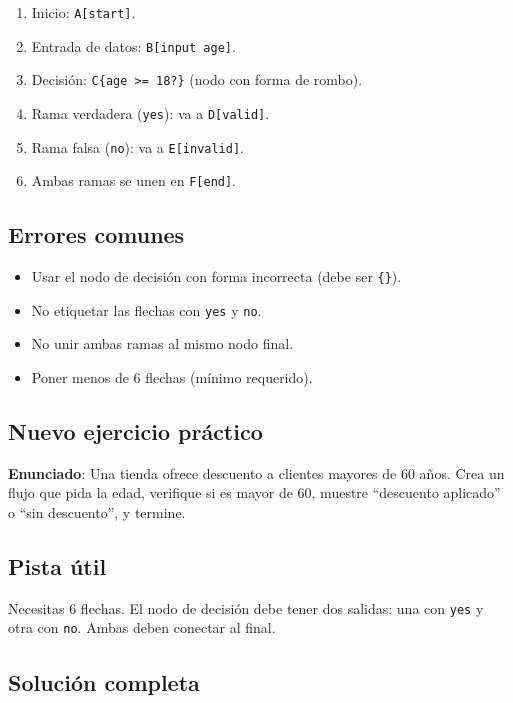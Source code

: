 \documentclass[12pt]{article}
\begin{document}
\begin{enumerate}
    \item Inicio: \texttt{A[start]}.
    \item Entrada de datos: \texttt{B[input age]}.
    \item Decisión: \texttt{C\{age >= 18?\}} (nodo con forma de rombo).
    \item Rama verdadera (\texttt{yes}): va a \texttt{D[valid]}.
    \item Rama falsa (\texttt{no}): va a \texttt{E[invalid]}.
    \item Ambas ramas se unen en \texttt{F[end]}.
\end{enumerate}

\subsection{Errores comunes}

\begin{itemize}
    \item Usar el nodo de decisión con forma incorrecta (debe ser \texttt{\{\}}).
    \item No etiquetar las flechas con \texttt{yes} y \texttt{no}.
    \item No unir ambas ramas al mismo nodo final.
    \item Poner menos de 6 flechas (mínimo requerido).
\end{itemize}

\subsection{Nuevo ejercicio práctico}

\textbf{Enunciado}: Una tienda ofrece descuento a clientes mayores de 60 años. Crea un flujo que pida la edad, verifique si es mayor de 60, muestre ``descuento aplicado'' o ``sin descuento'', y termine.

\subsection{Pista útil}

Necesitas 6 flechas. El nodo de decisión debe tener dos salidas: una con \texttt{yes} y otra con \texttt{no}. Ambas deben conectar al final.

\subsection{Solución completa}
\end{document}
